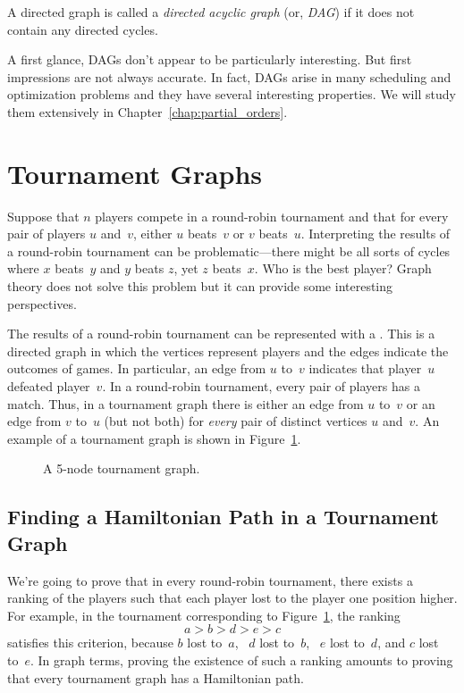 \begin{definition}
A directed graph is called a \emph{directed acyclic graph} (or,
\emph{DAG}) if it does not contain any directed cycles.
\end{definition}

A first glance, DAGs don't appear to be particularly interesting.  But
first impressions are not always accurate.  In fact, DAGs arise in
many scheduling and optimization problems and they have several
interesting properties.  We will study them extensively in
Chapter~\ref{chap:partial_orders}.

\section{Tournament Graphs}

Suppose that $n$ players compete in a round-robin tournament and that
for every pair of players $u$ and~$v$, either $u$ beats~$v$ or $v$
beats~$u$.  Interpreting the results of a round-robin tournament can
be problematic---there might be all sorts of cycles where $x$
beats~$y$ and $y$ beats $z$, yet $z$ beats~$x$.  Who is the best
player?  Graph theory does not solve this problem but it can provide
some interesting perspectives.

The results of a round-robin tournament can be represented with a
.  This is a directed graph in which the
vertices represent players and the edges indicate the outcomes of
games.  In particular, an edge from $u$ to~$v$ indicates that
player~$u$ defeated player~$v$.  In a round-robin tournament, every
pair of players has a match.  Thus, in a tournament graph there is
either an edge from $u$ to~$v$ or an edge from $v$ to~$u$ (but not
both) for \emph{every} pair of distinct vertices $u$ and~$v$.  An
example of a tournament graph is shown in Figure~\ref{fig:6EE1}.

\begin{figure}

\missinggraphic

\caption{A 5-node tournament graph.}

\label{fig:6EE1}

\end{figure}

\subsection{Finding a Hamiltonian Path in a Tournament Graph}

We're going to prove that in every round-robin tournament, there
exists a ranking of the players such that each player lost to the
player one position higher.  For example, in the tournament
corresponding to Figure~\ref{fig:6EE1}, the ranking
\begin{equation*}
    a > b > d > e > c
\end{equation*}
satisfies this criterion, because $b$ lost to~$a$, \ $d$ lost to~$b$,
\ $e$ lost to~$d$, and $c$ lost to~$e$.  In graph terms, proving the
existence of such a ranking amounts to proving that every tournament
graph has a Hamiltonian path.

